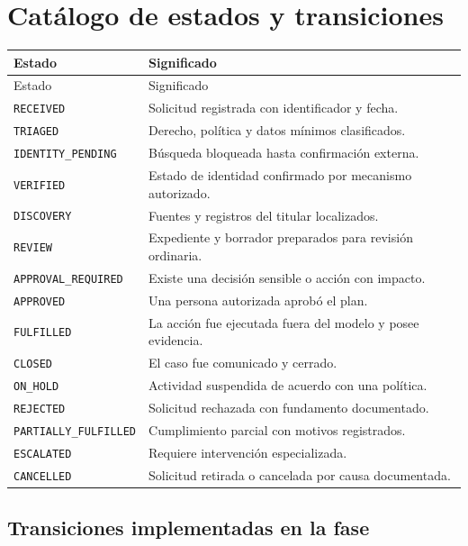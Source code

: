 \documentclass[11pt,a4paper]{article}
\begin{document}
\section{Catálogo de estados y transiciones}

\begin{longtable}{p{4cm}p{10.5cm}}
\toprule
Estado & Significado \\
\midrule
\endfirsthead
\toprule
Estado & Significado \\
\midrule
\endhead
\texttt{RECEIVED} & Solicitud registrada con identificador y fecha. \\
\texttt{TRIAGED} & Derecho, política y datos mínimos clasificados. \\
\texttt{IDENTITY\_PENDING} & Búsqueda bloqueada hasta confirmación externa. \\
\texttt{VERIFIED} & Estado de identidad confirmado por mecanismo autorizado. \\
\texttt{DISCOVERY} & Fuentes y registros del titular localizados. \\
\texttt{REVIEW} & Expediente y borrador preparados para revisión ordinaria. \\
\texttt{APPROVAL\_REQUIRED} & Existe una decisión sensible o acción con impacto. \\
\texttt{APPROVED} & Una persona autorizada aprobó el plan. \\
\texttt{FULFILLED} & La acción fue ejecutada fuera del modelo y posee evidencia. \\
\texttt{CLOSED} & El caso fue comunicado y cerrado. \\
\texttt{ON\_HOLD} & Actividad suspendida de acuerdo con una política. \\
\texttt{REJECTED} & Solicitud rechazada con fundamento documentado. \\
\texttt{PARTIALLY\_FULFILLED} & Cumplimiento parcial con motivos registrados. \\
\texttt{ESCALATED} & Requiere intervención especializada. \\
\texttt{CANCELLED} & Solicitud retirada o cancelada por causa documentada. \\
\bottomrule
\end{longtable}

\subsection{Transiciones implementadas en la fase}
\end{document}
